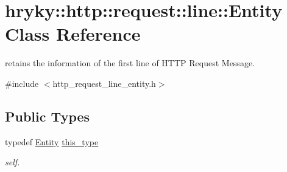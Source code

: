 \hypertarget{classhryky_1_1http_1_1request_1_1line_1_1_entity}{\section{hryky\-:\-:http\-:\-:request\-:\-:line\-:\-:Entity Class Reference}
\label{classhryky_1_1http_1_1request_1_1line_1_1_entity}
}


retains the information of the first line of H\-T\-T\-P Request Message.  




{\ttfamily \#include $<$http\-\_\-request\-\_\-line\-\_\-entity.\-h$>$}

\subsection*{Public Types}
\begin{DoxyCompactItemize}
\item 
\hypertarget{classhryky_1_1http_1_1request_1_1line_1_1_entity_a807b69de6e0754ec49a68d721dc32eed}{typedef \hyperlink{classhryky_1_1http_1_1request_1_1line_1_1_entity}{Entity} \hyperlink{classhryky_1_1http_1_1request_1_1line_1_1_entity_a807b69de6e0754ec49a68d721dc32eed}{this\-\_\-type}}\label{classhryky_1_1http_1_1request_1_1line_1_1_entity_a807b69de6e0754ec49a68d721dc32eed}

\begin{DoxyCompactList}\small\item\em self. \end{DoxyCompactList}\end{DoxyCompactItemize}
